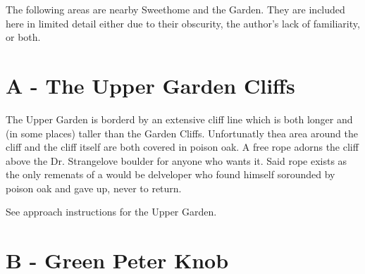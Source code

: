 





































\raggedcolumns
\begin{multicols}{2}


The following areas are nearby Sweethome and the Garden. They are included here in limited detail either due to their obscurity, the author's lack of familiarity, or both.\\



\needspace{6em}

\section{A - The Upper Garden Cliffs}\label{sa:The Upper Garden Cliffs}

The Upper Garden is borderd by an extensive cliff line which is both longer and (in some places) taller than the Garden Cliffs. Unfortunatly thea area around the cliff and the cliff itself are both covered in poison oak. A free rope adorns the cliff above the Dr. Strangelove boulder for anyone who wants it. Said rope exists as the only remenats of a would be delveloper who found himself sorounded by poison oak and gave up, never to return.

See approach instructions for the Upper Garden.\\




\needspace{6em}

\section{B - Green Peter Knob}\label{sa:Green Peter Knob}


\end{multicols}
